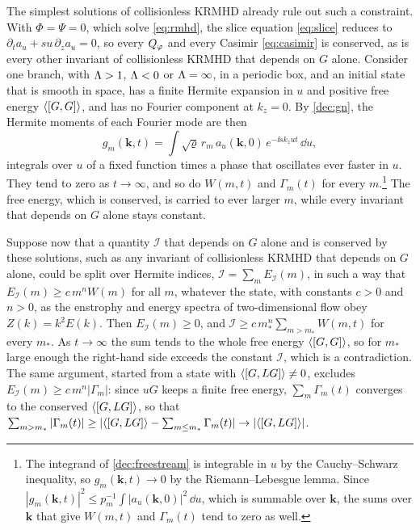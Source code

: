 The simplest solutions of collisionless KRMHD already rule out such a constraint. With $\Phi=\Psi=0$, which solve \eqref{eq:rmhd}, the slice equation \eqref{eq:slice} reduces to $\partial_ta_u+su\,\partial_za_u=0$, so every $Q_\varphi$ and every Casimir \eqref{eq:casimir} is conserved, as is every other invariant of collisionless KRMHD that depends on $G$ alone. Consider one branch, with $\Lambda>1$, $\Lambda<0$ or $\Lambda=\infty$, in a periodic box, and an initial state that is smooth in space, has a finite Hermite expansion in $u$ and positive free energy $\langle[G,G]\rangle$, and has no Fourier component at $k_z=0$. By \eqref{dec:gn}, the Hermite moments of each Fourier mode are then
\begin{equation}\label{dec:freestream}
  g_m(\boldsymbol k,t)=\int\sqrt\varrho\,r_m\,a_u(\boldsymbol k,0)\,e^{-\ii sk_zut}\,\dd u ,
\end{equation}
integrals over $u$ of a fixed function times a phase that oscillates ever faster in $u$. They tend to zero as $t\to\infty$, and so do $W(m,t)$ and $\Gamma_m(t)$ for every $m$.\footnote{The integrand of \eqref{dec:freestream} is integrable in $u$ by the Cauchy--Schwarz inequality, so $g_m(\boldsymbol k,t)\to0$ by the Riemann--Lebesgue lemma. Since $|g_m(\boldsymbol k,t)|^2\le p_m^{-1}\int|a_u(\boldsymbol k,0)|^2\,\dd u$, which is summable over $\boldsymbol k$, the sums over $\boldsymbol k$ that give $W(m,t)$ and $\Gamma_m(t)$ tend to zero as well.} The free energy, which is conserved, is carried to ever larger $m$, while every invariant that depends on $G$ alone stays constant.

Suppose now that a quantity $\mathcal I$ that depends on $G$ alone and is conserved by these solutions, such as any invariant of collisionless KRMHD that depends on $G$ alone, could be split over Hermite indices, $\mathcal I=\sum_mE_{\mathcal I}(m)$, in such a way that $E_{\mathcal I}(m)\ge c\,m^nW(m)$ for all $m$, whatever the state, with constants $c>0$ and $n>0$, as the enstrophy and energy spectra of two-dimensional flow obey $Z(k)=k^2E(k)$. Then $E_{\mathcal I}(m)\ge0$, and $\mathcal I\ge c\,m_*^n\sum_{m>m_*}W(m,t)$ for every $m_*$. As $t\to\infty$ the sum tends to the whole free energy $\langle[G,G]\rangle$, so for $m_*$ large enough the right-hand side exceeds the constant $\mathcal I$, which is a contradiction. The same argument, started from a state with $\langle[G,LG]\rangle\neq0$, excludes $E_{\mathcal I}(m)\ge c\,m^n|\Gamma_m|$: since $uG$ keeps a finite free energy, $\sum_m\Gamma_m(t)$ converges to the conserved $\langle[G,LG]\rangle$, so that $\sum_{m>m_*}|\Gamma_m(t)|\ge|\langle[G,LG]\rangle-\sum_{m\le m_*}\Gamma_m(t)|\to|\langle[G,LG]\rangle|$.

